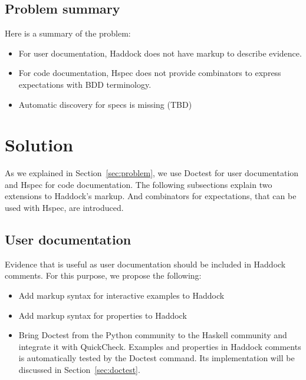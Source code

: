 \documentclass[preprint]{sigplanconf}
\begin{document}
\subsection{Problem summary}

Here is a summary of the problem:

\begin{itemize}
\item
    For user documentation,
    Haddock does not have markup to describe evidence.
\item
    For code documentation,
    Hspec does not provide combinators to express expectations with
    BDD terminology.
\item
    Automatic discovery for specs is missing (TBD)
\end{itemize}

\section{Solution}

As we explained in Section~\ref{sec:problem},
we use Doctest for user documentation and Hspec for code documentation.
The following subsections explain two extensions to Haddock's markup.
And combinators for expectations, that can be used with Hspec, are
introduced.

\subsection{User documentation}
\label{sec:user-doc}



Evidence that is useful as user documentation should be included in
Haddock comments.  For this purpose, we propose the following:

\begin{itemize}
\item Add markup syntax for interactive examples to Haddock
\item Add markup syntax for properties to Haddock
\item Bring Doctest from the Python community to the Haskell
community and integrate it with QuickCheck.
Examples and properties in Haddock comments is automatically
tested by the Doctest command.
Its implementation will be discussed in Section~\ref{sec:doctest}.

\end{itemize}
\end{document}
